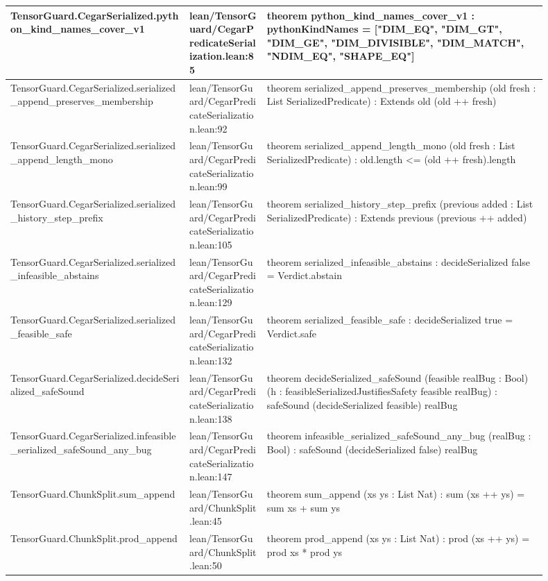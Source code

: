 \documentclass[10pt]{article}
\begin{document}
\begin{longtable}{|p{0.30\linewidth}|p{0.13\linewidth}|p{0.47\linewidth}|}
\hline
TensorGuard.CegarSerialized.python\_kind\_names\_cover\_v1 & lean/TensorGuard/CegarPredicateSerialization.lean:85 & theorem python\_kind\_names\_cover\_v1 : pythonKindNames = ["DIM\_EQ", "DIM\_GT", "DIM\_GE", "DIM\_DIVISIBLE", "DIM\_MATCH", "NDIM\_EQ", "SHAPE\_EQ"] \\
\hline
TensorGuard.CegarSerialized.serialized\_append\_preserves\_membership & lean/TensorGuard/CegarPredicateSerialization.lean:92 & theorem serialized\_append\_preserves\_membership (old fresh : List SerializedPredicate) : Extends old (old ++ fresh) \\
\hline
TensorGuard.CegarSerialized.serialized\_append\_length\_mono & lean/TensorGuard/CegarPredicateSerialization.lean:99 & theorem serialized\_append\_length\_mono (old fresh : List SerializedPredicate) : old.length <= (old ++ fresh).length \\
\hline
TensorGuard.CegarSerialized.serialized\_history\_step\_prefix & lean/TensorGuard/CegarPredicateSerialization.lean:105 & theorem serialized\_history\_step\_prefix (previous added : List SerializedPredicate) : Extends previous (previous ++ added) \\
\hline
TensorGuard.CegarSerialized.serialized\_infeasible\_abstains & lean/TensorGuard/CegarPredicateSerialization.lean:129 & theorem serialized\_infeasible\_abstains : decideSerialized false = Verdict.abstain \\
\hline
TensorGuard.CegarSerialized.serialized\_feasible\_safe & lean/TensorGuard/CegarPredicateSerialization.lean:132 & theorem serialized\_feasible\_safe : decideSerialized true = Verdict.safe \\
\hline
TensorGuard.CegarSerialized.decideSerialized\_safeSound & lean/TensorGuard/CegarPredicateSerialization.lean:138 & theorem decideSerialized\_safeSound (feasible realBug : Bool) (h : feasibleSerializedJustifiesSafety feasible realBug) : safeSound (decideSerialized feasible) realBug \\
\hline
TensorGuard.CegarSerialized.infeasible\_serialized\_safeSound\_any\_bug & lean/TensorGuard/CegarPredicateSerialization.lean:147 & theorem infeasible\_serialized\_safeSound\_any\_bug (realBug : Bool) : safeSound (decideSerialized false) realBug \\
\hline
TensorGuard.ChunkSplit.sum\_append & lean/TensorGuard/ChunkSplit.lean:45 & theorem sum\_append (xs ys : List Nat) : sum (xs ++ ys) = sum xs + sum ys \\
\hline
TensorGuard.ChunkSplit.prod\_append & lean/TensorGuard/ChunkSplit.lean:50 & theorem prod\_append (xs ys : List Nat) : prod (xs ++ ys) = prod xs * prod ys \\

\end{longtable}
\end{document}
